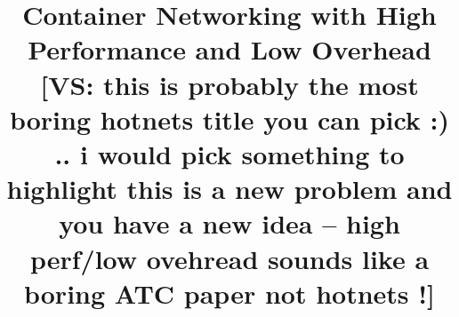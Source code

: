 \documentclass{cls/hotnets16}
\newcommand{\vyas}[1]{{\footnotesize\color{red}[VS: #1]}}
\begin{document}
\title{Container Networking with High Performance and Low Overhead \vyas{this is probably the most boring hotnets title you can pick :) .. i would pick 
 something to highlight this is a new problem and you have a new idea -- high perf/low ovehread sounds like a boring ATC paper not hotnets !}}

\date{}


\maketitle
\thispagestyle{empty}









%
%
\end{document}
